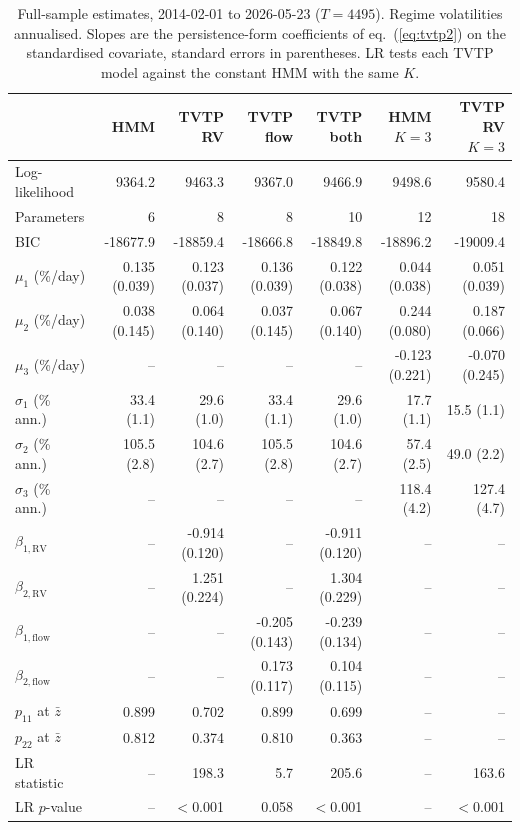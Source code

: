 \begin{table}[t]\centering\footnotesize\setlength{\tabcolsep}{4.5pt}
\caption{Full-sample estimates, 2014-02-01 to 2026-05-23 ($T=4495$). Regime volatilities annualised. Slopes are the persistence-form coefficients of eq.~(\ref{eq:tvtp2}) on the standardised covariate, standard errors in parentheses. LR tests each TVTP model against the constant HMM with the same $K$.}\label{tab:fits}
\begin{tabular}{lrrrrrr}\toprule & HMM & TVTP RV & TVTP flow & TVTP both & HMM $K{=}3$ & TVTP RV $K{=}3$ \\ \midrule
Log-likelihood & 9364.2 & 9463.3 & 9367.0 & 9466.9 & 9498.6 & 9580.4 \\
Parameters & 6 & 8 & 8 & 10 & 12 & 18 \\
BIC & -18677.9 & -18859.4 & -18666.8 & -18849.8 & -18896.2 & -19009.4 \\
$\mu_1$ (\%/day) & 0.135 (0.039) & 0.123 (0.037) & 0.136 (0.039) & 0.122 (0.038) & 0.044 (0.038) & 0.051 (0.039) \\
$\mu_2$ (\%/day) & 0.038 (0.145) & 0.064 (0.140) & 0.037 (0.145) & 0.067 (0.140) & 0.244 (0.080) & 0.187 (0.066) \\
$\mu_3$ (\%/day) & -- & -- & -- & -- & -0.123 (0.221) & -0.070 (0.245) \\
$\sigma_1$ (\% ann.) & 33.4 (1.1) & 29.6 (1.0) & 33.4 (1.1) & 29.6 (1.0) & 17.7 (1.1) & 15.5 (1.1) \\
$\sigma_2$ (\% ann.) & 105.5 (2.8) & 104.6 (2.7) & 105.5 (2.8) & 104.6 (2.7) & 57.4 (2.5) & 49.0 (2.2) \\
$\sigma_3$ (\% ann.) & -- & -- & -- & -- & 118.4 (4.2) & 127.4 (4.7) \\
$\beta_{1,\mathrm{RV}}$ & -- & -0.914 (0.120) & -- & -0.911 (0.120) & -- & -- \\
$\beta_{2,\mathrm{RV}}$ & -- & 1.251 (0.224) & -- & 1.304 (0.229) & -- & -- \\
$\beta_{1,\mathrm{flow}}$ & -- & -- & -0.205 (0.143) & -0.239 (0.134) & -- & -- \\
$\beta_{2,\mathrm{flow}}$ & -- & -- & 0.173 (0.117) & 0.104 (0.115) & -- & -- \\
$p_{11}$ at $\bar z$ & 0.899 & 0.702 & 0.899 & 0.699 & -- & -- \\
$p_{22}$ at $\bar z$ & 0.812 & 0.374 & 0.810 & 0.363 & -- & -- \\
LR statistic & -- & 198.3 & 5.7 & 205.6 & -- & 163.6 \\
LR $p$-value & -- & $<$0.001 & 0.058 & $<$0.001 & -- & $<$0.001 \\
\bottomrule\end{tabular}\end{table}
